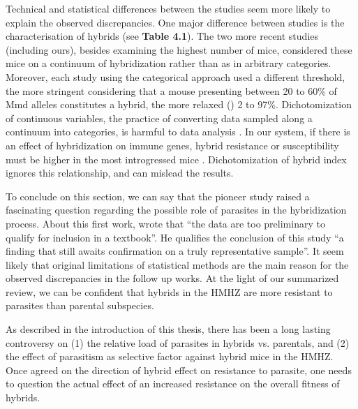 Technical and statistical differences between the studies seem more likely to explain the observed discrepancies. One major difference between studies is the characterisation of hybrids (see \textbf{Table 4.1}). The two more recent studies (including ours), besides examining the highest number of mice, considered these mice on a continuum of hybridization rather than as in arbitrary categories. Moreover, each study using the categorical approach used a different threshold, the more stringent \cite{moulia_wormy_1991} considering that a mouse presenting between 20 to 60\% of Mmd alleles constitutes a hybrid, the more relaxed (\cite{moulia_experimental_1993}) 2 to 97\%. Dichotomization of continuous variables, the practice of converting data sampled along a continuum into categories, is harmful to data analysis \citep{maccallum_practice_2002}. In our system, if there is an effect of hybridization on immune genes, hybrid resistance or susceptibility must be higher in the most introgressed mice \citep{baird_where_2012}. Dichotomization of hybrid index ignores this relationship, and can mislead the results. 
\par
To conclude on this section, we can say that the pioneer study \cite{sage_wormy_1986} raised a fascinating question regarding the possible role of parasites in the hybridization process. About this first work, \cite{klein_book_1988} wrote that “the data are too preliminary to qualify for inclusion in a textbook”. He qualifies the conclusion of this study “a finding that still awaits confirmation on a truly representative sample”. It seem likely that original limitations of statistical methods are the main reason for the observed discrepancies in the follow up works. At the light of our summarized review, we can be confident that hybrids in the HMHZ are more resistant to parasites than parental subspecies.
\par
As described in the introduction of this thesis, there has been a long lasting controversy on (1) the relative load of parasites in hybrids vs. parentals, and (2) the effect of parasitism as selective factor against hybrid mice in the HMHZ. Once agreed on the direction of hybrid effect on resistance to parasite, one needs to question the actual effect of an increased resistance on the overall fitness of hybrids.

